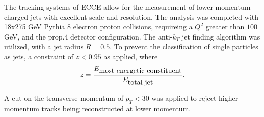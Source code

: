 The tracking systems of ECCE allow for the measurement of lower momentum charged jets with excellent scale and resolution.  The analysis was completed with 18x275 GeV Pythia 8 electron proton collisions, requireing a $Q^2$ greater than $100$ GeV, and the prop.4 detector configuration.  The anti-$k_T$ jet finding algorithm was utilized, with a jet radius $R=0.5$.  To prevent the classification of single particles as jets, a constraint of $z<0.95$ as applied, where 
\begin{equation}
z=\frac{E_{\hbox{most energetic constituent}}}{E_{\hbox{total jet}}}.
\label{eq:jet_z}
\end{equation}

A cut on the transverse momentum of $p_T<30$ was applied to reject higher momentum tracks being reconstructed at lower momentum.  


